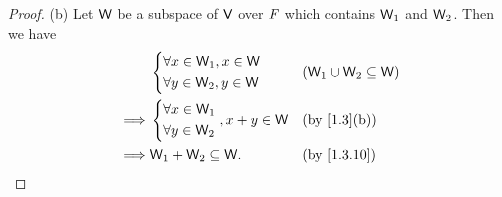 \begin{proof}{(b)}
	Let \(\mathsf{W}\) be a subspace of \(\mathsf{V}\) over \(\mathit{F}\) which contains \(\mathsf{W}_1\) and \(\mathsf{W}_2\).
	Then we have
	\begin{align*}
		         & \begin{dcases}
			\forall x \in \W_1, x \in \W \\
			\forall y \in \W_2, y \in \W
		\end{dcases}               &  & (\W_1 \cup \W_2 \subseteq \W) \\
		\implies & \begin{dcases}
			\forall x \in \W_1 \\
			\forall y \in \W_2
		\end{dcases}, x + y \in \W &  & \text{(by \cref{1.3}(b))}     \\
		\implies & \W_1 + \W_2 \subseteq \W.                &  & \text{(by \cref{1.3.10})}
	\end{align*}
\end{proof}